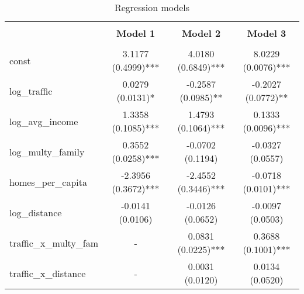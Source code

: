 
    \begin{table}
        \centering
        \caption{Regression models}
        \vspace{10pt}
        \label{tab:regression_models}
        \begin{tabular}{lccc}
        \hline
        \hline \\[-1.8ex]
     & \textbf{Model 1} & \textbf{Model 2} & \textbf{Model 3} \\
\hline \\[-1.8ex] 
const & 3.1177 (0.4999)*** & 4.0180 (0.6849)*** & 8.0229 (0.0076)*** \\
log\_traffic & 0.0279 (0.0131)* & -0.2587 (0.0985)** & -0.2027 (0.0772)** \\
log\_avg\_income & 1.3358 (0.1085)*** & 1.4793 (0.1064)*** & 0.1333 (0.0096)*** \\
log\_multy\_family & 0.3552 (0.0258)*** & -0.0702 (0.1194) & -0.0327 (0.0557) \\
homes\_per\_capita & -2.3956 (0.3672)*** & -2.4552 (0.3446)*** & -0.0718 (0.0101)*** \\
log\_distance & -0.0141 (0.0106) & -0.0126 (0.0652) & -0.0097 (0.0503) \\
traffic\_x\_multy\_fam & - & 0.0831 (0.0225)*** & 0.3688 (0.1001)*** \\
traffic\_x\_distance & - & 0.0031 (0.0120) & 0.0134 (0.0520) \\

        \hline
        \hline
        \end{tabular}
    \end{table}
    